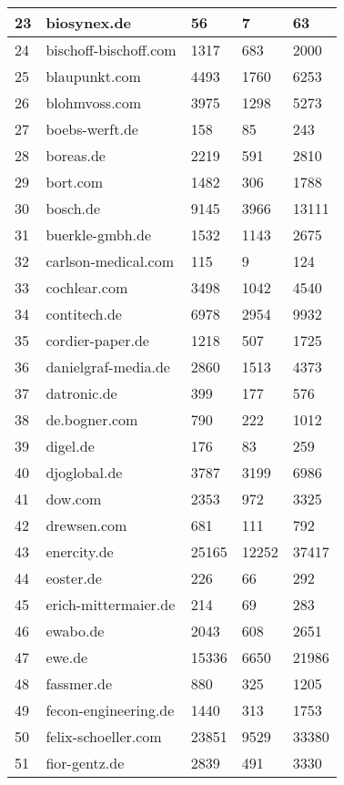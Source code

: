 \begin{longtable}{|m{0.5cm}|m{5cm}|m{2cm}|m{2cm}|m{2cm}|}
	\hline
	23 & biosynex.de & 56 & 7 & 63\\
	\hline
	24 & bischoff-bischoff.com & 1317 & 683 & 2000\\
	\hline
	25 & blaupunkt.com & 4493 & 1760 & 6253\\
	\hline
	26 & blohmvoss.com & 3975 & 1298 & 5273\\
	\hline
	27 & boebs-werft.de & 158 & 85 & 243\\
	\hline
	28 & boreas.de & 2219 & 591 & 2810\\
	\hline
	29 & bort.com & 1482 & 306 & 1788\\
	\hline
	30 & bosch.de & 9145 & 3966 & 13111\\
	\hline
	31 & buerkle-gmbh.de & 1532 & 1143 & 2675\\
	\hline
	32 & carlson-medical.com & 115 & 9 & 124\\
	\hline
	33 & cochlear.com & 3498 & 1042 & 4540\\
	\hline
	34 & contitech.de & 6978 & 2954 & 9932\\
	\hline
	35 & cordier-paper.de & 1218 & 507 & 1725\\
	\hline
	36 & danielgraf-media.de & 2860 & 1513 & 4373\\
	\hline
	37 & datronic.de & 399 & 177 & 576\\
	\hline
	38 & de.bogner.com & 790 & 222 & 1012\\
	\hline
	39 & digel.de & 176 & 83 & 259\\
	\hline
	40 & djoglobal.de & 3787 & 3199 & 6986\\
	\hline
	41 & dow.com & 2353 & 972 & 3325\\
	\hline
	42 & drewsen.com & 681 & 111 & 792\\
	\hline
	43 & enercity.de & 25165 & 12252 & 37417\\
	\hline
	44 & eoster.de & 226 & 66 & 292\\
	\hline
	45 & erich-mittermaier.de & 214 & 69 & 283\\
	\hline
	46 & ewabo.de & 2043 & 608 & 2651\\
	\hline
	47 & ewe.de & 15336 & 6650 & 21986\\
	\hline
	48 & fassmer.de & 880 & 325 & 1205\\
	\hline
	49 & fecon-engineering.de & 1440 & 313 & 1753\\
	\hline
	50 & felix-schoeller.com & 23851 & 9529 & 33380\\
	\hline
	51 & fior-gentz.de & 2839 & 491 & 3330\\
	\hline

\end{longtable}
